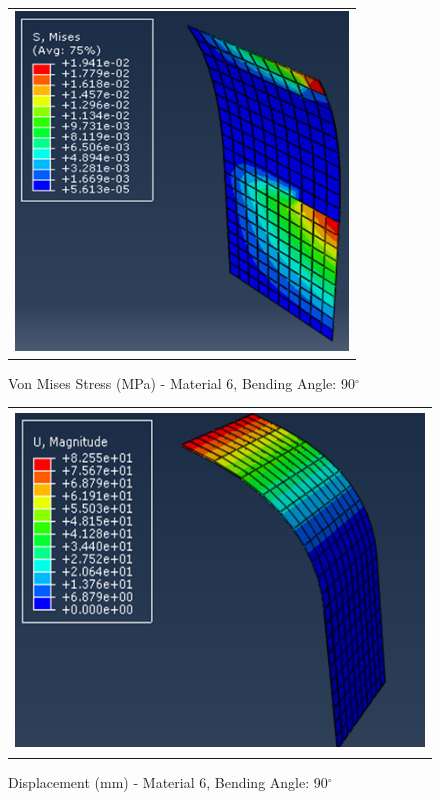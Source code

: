 \documentclass[a4paper,12pt]{article}
\numberwithin{equation}{section}
\numberwithin{figure}{section}
\begin{document}
\begin{figure}[H]
  \centering
  \begin{tabular}{@{}c@{}}
    \includegraphics[width=0.7\linewidth,height=255pt]{Results/Bending/M6_VMS_90_new.png} \\
  \end{tabular}
  \caption{Von Mises Stress (MPa) - Material 6,  Bending Angle: 90$^{\circ}$ }
\end{figure}

\begin{figure}[H]
  \centering
  \begin{tabular}{@{}c@{}}
    \includegraphics[width=0.7\linewidth,height=255pt]{Results/Bending/M6_DIS_90_new.png} \\
  \end{tabular}
  \caption{Displacement (mm) - Material 6, Bending Angle: 90$^{\circ}$ }
\end{figure}
\end{document}
